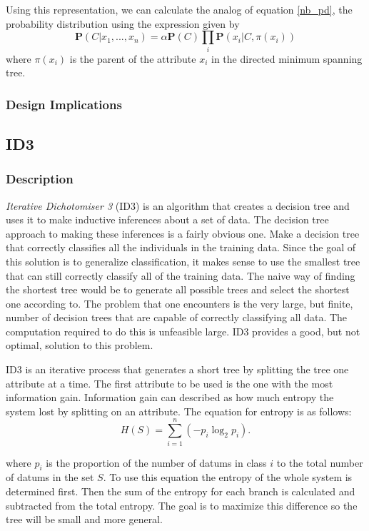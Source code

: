 \documentclass{article}
\newcommand{\ve}[1]{\boldsymbol{\mathbf{#1}}}
\begin{document}
				Using this representation, we can calculate the analog of equation \ref{nb_pd}, the probability distribution using the expression given by \cite{Zheng2010}
				\begin{equation}
						\ve{P}(C|x_1,...,x_n) = \alpha \ve{P}(C) \prod_i \ve{P}(x_i| C, \pi(x_i)) \label{tan_pd}
				\end{equation}
				where $\pi(x_i)$ is the parent of the attribute $x_i$ in the directed minimum spanning tree.
			\subsubsection{Design Implications}
		\subsection{ID3}
			\subsubsection{Description}
				\textit{Iterative Dichotomiser 3} (ID3) is an algorithm that creates a decision tree and uses it to make inductive inferences about a set of data.
				The decision tree approach to making these inferences is a fairly obvious one.
				Make a decision tree that correctly classifies all the individuals in the training data.
				Since the goal of this solution is to generalize classification, it makes sense to use the smallest tree that can still correctly classify all of the training data.
				The naive way of finding the shortest tree would be to generate all possible trees and select the shortest one according to\cite{Quinlan1986}.
				The problem that one encounters is the very large, but finite, number of decision trees that are capable of correctly classifying all data.
				The computation required to do this is unfeasible large.
				ID3 provides a good, but not optimal, solution to this problem.
		
				ID3 is an iterative process that generates a short tree by splitting the tree one attribute at a time. The first attribute to be used is the one with the most information gain. Information gain can described as how much entropy the system lost by splitting on an attribute. The equation for entropy is as follows:
				\begin{equation*}
					H(S) = \sum_{i=1}^{n} \left( -p_i \log_2 p_i \right).
				\end{equation*}		
				
				where $p_i$ is the proportion of the number of datums in class $i$ to the total number of datums in the set $S$. To use this equation the entropy of the whole system is determined first. Then the sum of the entropy for each branch is calculated and subtracted from the total entropy. The goal is to maximize this difference so the tree will be small and more general.
				
\end{document}
